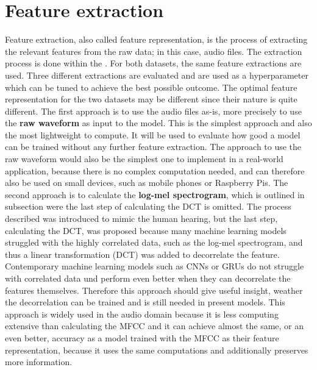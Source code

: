 \section{Feature extraction}
\label{sec:Feature-Extraction}
Feature extraction, also called feature representation, is the process of extracting the relevant features from the raw data; in this case, audio files. The extraction process is done within the . For both datasets, the same feature extractions are used. Three different extractions are evaluated and are used as a hyperparameter which can be tuned to achieve the best possible outcome. The optimal feature representation for the two datasets may be different since their nature is quite different.
\newline
\newline
The first approach is to use the audio files as-is, more precisely to use the \textbf{raw waveform} as input to the model. This is the simplest approach and also the most lightweight to compute. It will be used to evaluate how good a model can be trained without any further feature extraction. The approach to use the raw waveform would also be the simplest one to implement in a real-world application, because there is no complex computation needed, and can therefore also be used on small devices, such as mobile phones or Raspberry Pis.
\newline
\newline
The second approach is to calculate the \textbf{log-mel spectrogram}, which is outlined in subsection  were the last step of calculating the \gls{DCT} is omitted. The process described was introduced to mimic the human hearing, but the last step, calculating the \gls{DCT}, was proposed because many machine learning models struggled with the highly correlated data, such as the log-mel spectrogram, and thus a linear transformation (\gls{DCT}) was added to decorrelate the feature. Contemporary machine learning models such as CNNs or GRUs do not struggle with correlated data und perform even better when they can decorrelate the features themselves. Therefore this approach should give useful insight, weather the decorrelation can be trained and is still needed in present models.
\newline
This approach is widely used in the audio domain because it is less computing extensive than calculating the \gls{MFCC} and it can achieve almost the same, or an even better, accuracy as a model trained with the \gls{MFCC} as their feature representation, because it uses the same computations and additionally preserves more information.
